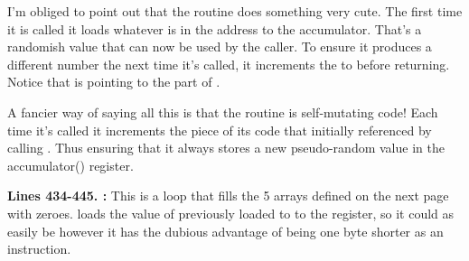 I'm obliged to point out that the routine does something very cute. The first time it is called it loads whatever is in the address  to the accumulator. That's a randomish value that can now 
be used by the caller. To ensure it produces a different number the next time it's called, it increments the  to  before returning. Notice that
 is pointing to the  part of . 

A fancier way of saying all this is that
the routine is self-mutating code! Each time it's called it increments the piece of its code that initially referenced  by calling . 
Thus ensuring that it always stores a new pseudo-random value in the accumulator() register.

\bigskip
\textbf{Lines 434-445. :} This is a loop that fills the 5 arrays defined on the next page with zeroes.
 loads the value of  previously loaded to  to the  register, so it could as easily be 
however it has the dubious advantage of being one byte shorter as an instruction.

